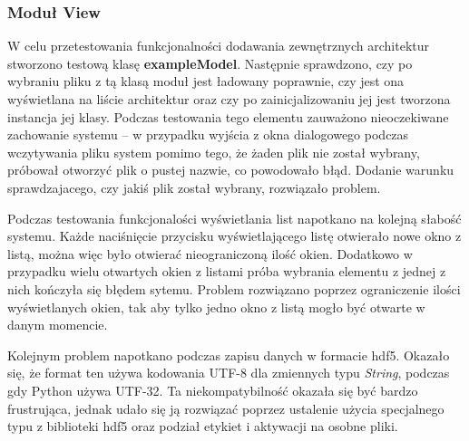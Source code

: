 \documentclass[a4paper,twoside,12pt]{book}
\begin{document}
{\subsubsection{Moduł View}
{W celu przetestowania funkcjonalności dodawania zewnętrznych architektur stworzono testową klasę \textbf{exampleModel}. Następnie sprawdzono, czy po wybraniu pliku z tą klasą moduł jest ładowany poprawnie, czy jest ona wyświetlana na liście architektur oraz czy po zainicjalizowaniu jej jest tworzona instancja jej klasy. Podczas testowania tego elementu zauważono nieoczekiwane zachowanie systemu – w przypadku wyjścia z okna dialogowego podczas wczytywania pliku system pomimo tego, że żaden plik nie został wybrany, próbował otworzyć plik o pustej nazwie, co powodowało błąd. Dodanie warunku sprawdzajacego, czy jakiś plik został wybrany, rozwiązało problem.}

{Podczas testowania funkcjonalości wyświetlania list napotkano na kolejną słabość systemu. Każde naciśnięcie przycisku wyświetlającego listę otwierało nowe okno z listą, można więc było otwierać nieograniczoną ilość okien. Dodatkowo w przypadku wielu otwartych okien z listami próba wybrania elementu z jednej z nich kończyła się błędem sytemu. Problem rozwiązano poprzez ograniczenie ilości wyświetlanych okien, tak aby tylko jedno okno z listą mogło być otwarte w danym momencie. }

{Kolejnym problem napotkano podczas zapisu danych w formacie hdf5. Okazało się, że format ten używa kodowania UTF-8 dla zmiennych typu \emph{String}, podczas gdy Python używa UTF-32. Ta niekompatybilność okazała się być bardzo frustrująca, jednak udało się ją rozwiązać poprzez ustalenie użycia specjalnego typu z biblioteki hdf5 oraz podział etykiet i aktywacji na osobne pliki.}

}
\end{document}
